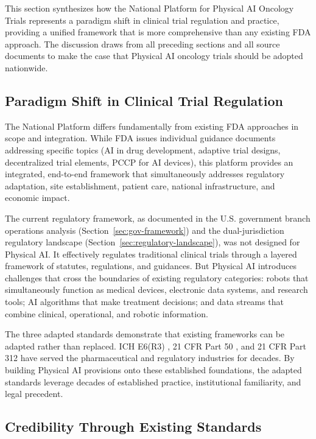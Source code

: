 
This section synthesizes how the National Platform for Physical AI Oncology
Trials represents a paradigm shift in clinical trial regulation and practice,
providing a unified framework that is more comprehensive than any existing FDA
approach. The discussion draws from all preceding sections and all source
documents to make the case that Physical AI oncology trials should be adopted
nationwide.

\subsection{Paradigm Shift in Clinical Trial Regulation}
\label{subsec:discuss-paradigm}

The National Platform differs fundamentally from existing FDA approaches in
scope and integration. While FDA issues individual guidance documents addressing
specific topics (AI in drug development, adaptive trial designs, decentralized
trial elements, PCCP for AI devices), this platform provides an integrated,
end-to-end framework that simultaneously addresses regulatory adaptation, site
establishment, patient care, national infrastructure, and economic impact.

The current regulatory framework, as documented in the U.S. government branch
operations analysis (Section~\ref{sec:gov-framework}) and the dual-jurisdiction
regulatory landscape (Section~\ref{sec:regulatory-landscape}), was not designed
for Physical AI. It effectively regulates traditional clinical trials through a
layered framework of statutes, regulations, and guidances. But Physical AI
introduces challenges that cross the boundaries of existing regulatory
categories: robots that simultaneously function as medical devices, electronic
data systems, and research tools; AI algorithms that make treatment decisions;
and data streams that combine clinical, operational, and robotic information.

The three adapted standards \cite{ich-adapt, cfr50-adapt, cfr312-adapt}
demonstrate that existing frameworks can be adapted rather than replaced. ICH
E6(R3) \cite{ich-e6r3}, 21 CFR Part 50 \cite{cfr-part-50}, and 21 CFR Part
312 \cite{cfr-part-312} have served the pharmaceutical and regulatory
industries for decades. By building Physical AI provisions onto these
established foundations, the adapted standards leverage decades of established
practice, institutional familiarity, and legal precedent.

\subsection{Credibility Through Existing Standards}
\label{subsec:discuss-credibility}


